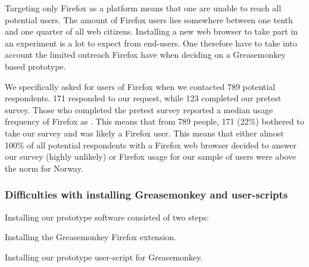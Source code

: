 Targeting only Firefox as a platform means that one are unable to reach
all potential users. The amount of Firefox users lies somewhere
between one tenth and one quarter of all web citizens.%
Installing a new web browser to take part in an
experiment is a lot to expect from end-users. One therefore have to take into
account the limited outreach Firefox have when deciding on a Greasemonkey
based prototype.

We specifically asked for users of Firefox when we contacted
789 potential respondents. 171 responded to our request, while 123 completed
our pretest survey.%
Those who completed the pretest survey reported a median usage frequency of
Firefox as
.%
This means that from 789 people, 171 (22\%) bothered to take our survey and
was likely a Firefox user.
This means that either almost 100\% of all potential respondents with a
Firefox web browser decided to answer our survey (highly unlikely) or Firefox
usage for our sample of \urort{} users were above the norm for Norway.

\subsubsection{Difficulties with installing Greasemonkey and user-scripts}

Installing our prototype software consisted of two steps:

\begin{enum}
  \item Installing the Greasemonkey Firefox extension.
  \item Installing our prototype user-script for Greasemonkey.
\end{enum}

